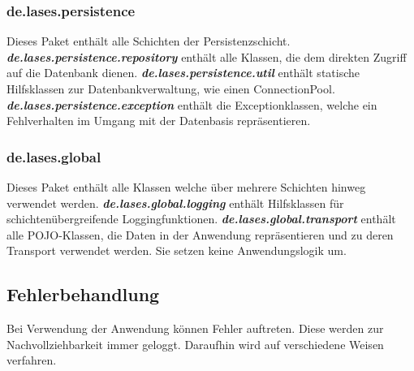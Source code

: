 \subsubsection{de.lases.persistence}\label{arch:persistence}
Dieses Paket enthält alle Schichten der Persistenzschicht.
\newline\newline
\textbf{\emph{de.lases.persistence.repository}}\label{arch:repository}
enthält alle Klassen, die dem direkten Zugriff auf die Datenbank dienen.
\newline\newline
\textbf{\emph{de.lases.persistence.util}}
enthält statische Hilfsklassen zur Datenbankverwaltung, wie einen
Connection\-Pool.
\newline\newline
\textbf{\emph{de.lases.persistence.exception}}
enthält die Exceptionklassen, welche ein Fehlverhalten im Umgang mit der
Datenbasis repräsentieren.

\subsubsection{de.lases.global}
Dieses Paket enthält alle Klassen welche über mehrere Schichten hinweg
verwendet werden.
\newline\newline
\textbf{\emph{de.lases.global.logging}}
enthält Hilfsklassen für schichtenübergreifende Loggingfunktionen.
\newline\newline
\textbf{\emph{de.lases.global.transport}}\label{arch:transport}
enthält alle POJO-Klassen, die Daten in der Anwendung repräsentieren und zu deren
Transport verwendet werden. Sie setzen keine Anwendungslogik um.

\subsection{Fehlerbehandlung}
Bei Verwendung der Anwendung können Fehler auftreten. Diese werden zur Nachvollziehbarkeit
immer geloggt. Daraufhin wird auf verschiedene Weisen verfahren.

